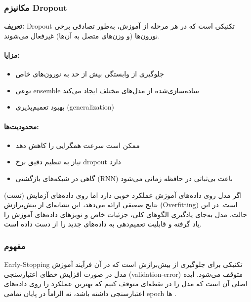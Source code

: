 \subsubsection*{مکانیزم Dropout}

\textbf{تعریف:}
Dropout تکنیکی است که در هر مرحله از آموزش، به‌طور تصادفی برخی نورون‌ها (و وزن‌های متصل به آن‌ها) غیرفعال می‌شوند.

\paragraph{مزایا:}
\begin{itemize}
	\item جلوگیری از وابستگی بیش از حد به نورون‌های خاص
	\item نوعی ensemble ساده‌سازی‌شده از مدل‌های مختلف ایجاد می‌کند
	\item بهبود تعمیم‌پذیری (generalization)
\end{itemize}

\paragraph{محدودیت‌ها:}
\begin{itemize}
	\item ممکن است سرعت همگرایی را کاهش دهد
	\item نیاز به تنظیم دقیق نرخ dropout دارد
	\item گاهی در شبکه‌های بازگشتی (RNN) باعث بی‌ثباتی در حافظه زمانی می‌شود
\end{itemize}


اگر مدل روی داده‌های آموزش عملکرد خوبی دارد اما روی داده‌های آزمایش (تست) نتایج ضعیفی ارائه می‌دهد، این نشانه‌ای از {بیش‌برازش (Overfitting)} است. در این حالت، مدل به‌جای یادگیری الگوهای کلی، جزئیات خاص و نویزهای داده‌های آموزش را یاد گرفته و قابلیت تعمیم‌دهی به داده‌های جدید را از دست داده است.

\subsubsection*{مفهوم }


{Early-Stopping} تکنیکی برای جلوگیری از بیش‌برازش است که در آن فرآیند آموزش مدل در صورت افزایش خطای اعتبارسنجی (validation-error) متوقف می‌شود. ایده اصلی آن است که مدل را در نقطه‌ای متوقف کنیم که بهترین عملکرد را روی داده‌های اعتبارسنجی داشته باشد، نه الزاماً در پایان تمامی epoch ها .

